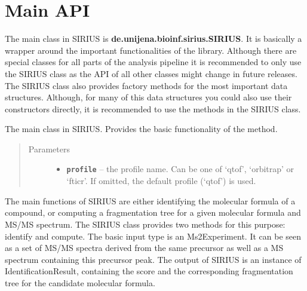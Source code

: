 \documentclass[letterpaper,10pt,openany,oneside]{sphinxmanual}
\begin{document}

\section{Main API}
\label{library:main-api}

The main class in SIRIUS is \textbf{de.unijena.bioinf.sirius.SIRIUS}. It is
basically a wrapper around the important functionalities of the
library. Although there are special classes for all parts of the analysis
pipeline it is recommended to only use the SIRIUS class as the API of all
other classes might change in future releases. The SIRIUS class also
provides factory methods for the most important data structures. Although,
for many of this data structures you could also use their constructors
directly, it is recommended to use the methods in the SIRIUS class.

\label{library:package-de.unijena.bioinf.sirius}

\begin{fulllineitems}
\label{library:de.unijena.bioinf.sirius.SIRIUS}
The main class in SIRIUS. Provides the basic functionality of the method.
\begin{quote}\begin{description}
\item[{Parameters}] \leavevmode\begin{itemize}
\item {} 
\textbf{\texttt{profile}} -- the profile name. Can be one of `qtof', `orbitrap' or `fticr'. If omitted, the default profile (`qtof') is used.

\end{itemize}

\end{description}\end{quote}

\end{fulllineitems}

The main functions of SIRIUS are either identifying the molecular formula
of a compound, or computing a fragmentation tree for a given molecular formula
and MS/MS spectrum. The SIRIUS class provides two methods for this purpose:
identify and compute. The basic input type is an Ms2Experiment. It can be
seen as a set of MS/MS spectra derived from the same precursor as well as a
MS spectrum containing this precursor peak. The output of SIRIUS is an
instance of IdentificationResult, containing the score and the corresponding
fragmentation tree for the candidate molecular formula.
\end{document}
